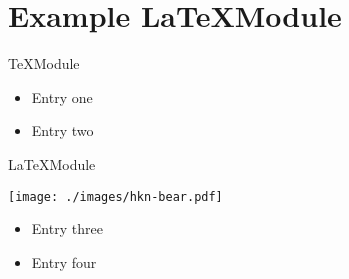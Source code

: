 \section{Example \LaTeX Module}

\begin{frame}{\TeX Module}

    \begin{itemize}
        \item<1-> Entry one
        \item<2-> Entry two
    \end{itemize}
\end{frame}

\begin{frame}{\LaTeX Module}

    \texttt{[image: ./images/hkn-bear.pdf]}
    \begin{itemize}
        \item<1-> Entry three
        \item<2-> Entry four
    \end{itemize}
\end{frame}

